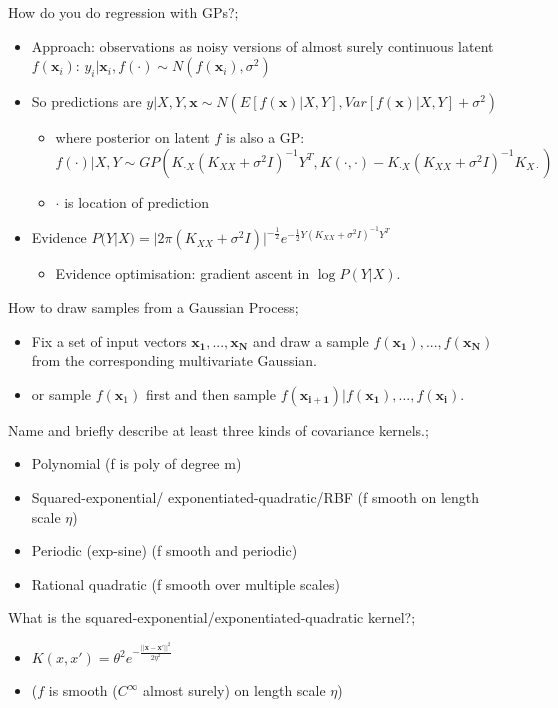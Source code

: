 \documentclass{article}
\begin{document}
How do you do regression with GPs?; \begin{itemize}
    \item Approach: observations as noisy versions of almost surely continuous latent $f(\mathbf{x}_i)$: $y_i|\mathbf{x}_i, f(\cdot)\sim N(f(\mathbf{x}_i), \sigma^2)$
    \item So predictions are $y|X, Y, \mathbf{x}\sim N(E[f(\mathbf{x})|X, Y], Var[f(\mathbf{x})|X, Y]+\sigma^2)$
    \begin{itemize}
        \item where posterior on latent $f$ is also a GP: $f(\cdot)|X,Y\sim GP(K_{\cdot X}(K_{XX}+\sigma^2I)^{-1}Y^T, K(\cdot, \cdot)-K_{\cdot X}(K_{XX}+\sigma^2I)^{-1}K_{X\cdot})$
        \item $\cdot$ is location of prediction
    \end{itemize}
    \item Evidence $P(Y|X)=|2\pi(K_{XX}+\sigma^2I)|^{-\frac{1}{2}}e^{-\frac{1}{2}Y(K_{XX}+\sigma^2I)^{-1}Y^T}$
    \begin{itemize}
        \item Evidence optimisation: gradient ascent in $\log P(Y|X)$.
    \end{itemize}
\end{itemize}

How to draw samples from a Gaussian Process; \begin{itemize}
    \item Fix a set of input vectors $\mathbf{x_1, ..., x_N}$ and draw a sample $f(\mathbf{x_1}),...,f(\mathbf{x_N})$ from the corresponding multivariate Gaussian.
    \item or sample $f(\mathbf{x}_1)$ first and then sample $f(\mathbf{x_{i+1}})|f(\mathbf{x_1}),...,f(\mathbf{x_i})$.
\end{itemize}

Name and briefly describe at least three kinds of covariance kernels.; \begin{itemize}
    \item Polynomial (f is poly of degree m)
    \item Squared-exponential/ exponentiated-quadratic/RBF (f smooth on length scale $\eta$)
    \item Periodic (exp-sine) (f smooth and periodic)
    \item Rational quadratic (f smooth over multiple scales)
\end{itemize}

What is the squared-exponential/exponentiated-quadratic kernel?; \begin{itemize}
    \item $K(x, x')=\theta^2e^{-\frac{||\mathbf{x}-\mathbf{x'}||^2}{2\eta^2}}$
    \item ($f$ is smooth ($C^\infty$ almost surely) on length scale $\eta$)
\end{itemize}
\end{document}
